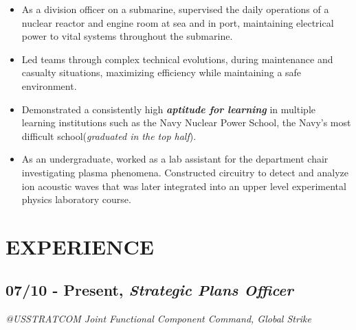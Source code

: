 \documentclass[10pt]{article}
\begin{document}
\begin{itemize}
\itemsep1pt\parskip0pt
\item
  As a division officer on a submarine, supervised the daily operations
  of a nuclear reactor and engine room at sea and in port, maintaining
  electrical power to vital systems throughout the submarine.
\item
  Led teams through complex technical evolutions, during maintenance and
  casualty situations, maximizing efficiency while maintaining a safe
  environment.
\item
  Demonstrated a consistently high \textbf{\emph{aptitude for learning}}
  in multiple learning institutions such as the Navy Nuclear Power
  School, the Navy's most difficult school(\emph{graduated in the top
  half}).
\item
  As an undergraduate, worked as a lab assistant for the department
  chair investigating plasma phenomena. Constructed circuitry to detect
  and analyze ion acoustic waves that was later integrated into an upper
  level experimental physics laboratory course.
\end{itemize}

\section{EXPERIENCE}\label{experience}

\subsection{07/10 - Present, \textbf{\emph{Strategic Plans
Officer}}}\label{present-strategic-plans-officer}

\emph{@USSTRATCOM Joint Functional Component Command, Global Strike}
\end{document}
